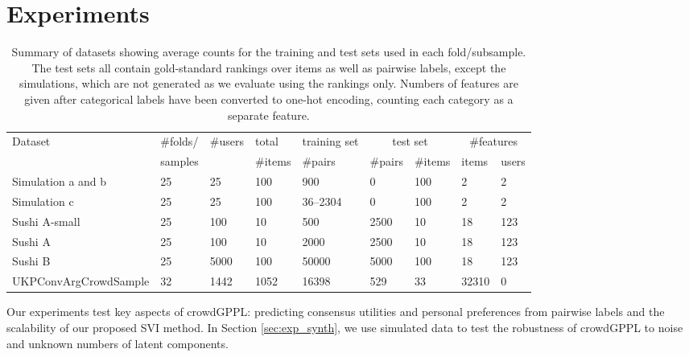 \section{Experiments}\label{sec:expts}

\begin{table}[h]
\centering
\small
 \setlength{\tabcolsep}{4pt}
\begin{tabular}{l l l l l l l l l }
\toprule
Dataset & \#folds/ & \#users & total & training set & \multicolumn{2}{c}{test set} & \multicolumn{2}{c}{\#features} \\
              & samples &              & \#items & \#pairs  & \#pairs & \#items
               & items & users \\
\midrule
Simulation a and b & 25 & 25 & 100 & 900 & 0 & 100 & 2 & 2 \\
Simulation c & 25 & 25 & 100 & 36--2304 & 0 & 100 & 2 & 2\\
\midrule
Sushi A-small & 25 & 100 & 10 & 500 & 2500 & 10 & 18 & 123 \\
Sushi A & 25 & 100 & 10 & 2000 & 2500 & 10 & 18 & 123 \\
Sushi B & 25 & 5000 & 100 & 50000 & 5000 & 100 &  18 & 123 \\
\midrule
UKPConvArgCrowdSample & 32 & 1442 & 1052 & 16398 & 529 & 33 & 32310 & 0
\\ \bottomrule
\end{tabular}
\caption{Summary of datasets showing average counts for the training and test sets
used in each fold/subsample. 
The test sets all contain gold-standard rankings over items as well as
pairwise labels, except the simulations, which are not generated as
 we evaluate using the rankings only.
Numbers of features are given after categorical labels have been converted to one-hot encoding, counting
each category as a separate feature.
}
\label{tab:datasets}
\end{table}
Our experiments test key aspects of crowdGPPL: 
 predicting consensus utilities and personal preferences from pairwise labels
 and the scalability of our proposed SVI method.
In Section \ref{sec:exp_synth}, we use simulated data to test the robustness of crowdGPPL
to noise and unknown numbers of latent components.
